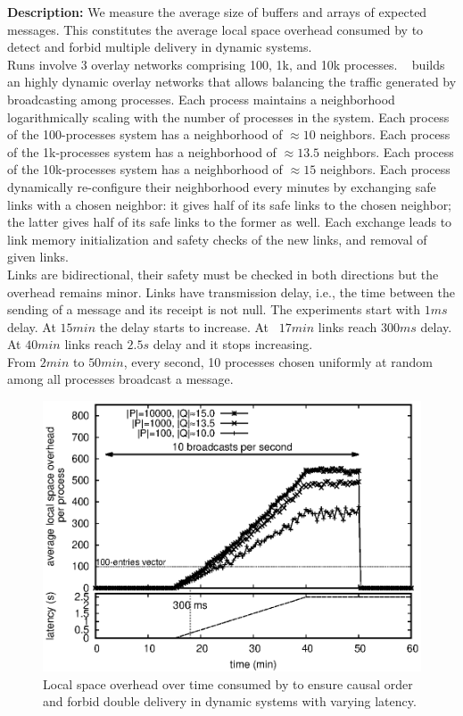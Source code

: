 \noindent \textbf{Description:} We measure the average size of buffers and
arrays of expected messages. This constitutes the average local space overhead
consumed by \RPCBROADCAST to detect and forbid multiple delivery in dynamic
systems.\\
Runs involve 3 overlay networks comprising 100, 1k, and 10k
processes. \SPRAY~\cite{nedelec2017adaptive} builds an highly dynamic overlay
networks that allows balancing the traffic generated by broadcasting among
processes. Each process maintains a neighborhood logarithmically scaling with
the number of processes in the system. Each process of the 100-processes system
has a neighborhood of $\approx 10$ neighbors. Each process of the 1k-processes
system has a neighborhood of $\approx 13.5$ neighbors. Each process of the
10k-processes system has a neighborhood of $\approx 15$ neighbors. Each process
dynamically re-configure their neighborhood every minutes by exchanging safe
links with a chosen neighbor: it gives half of its safe links to the chosen
neighbor; the latter gives half of its safe links to the former as well. Each
exchange leads to link memory initialization and safety checks of the new links,
and removal of given links.\\ Links are bidirectional, their safety must be
checked in both directions but the overhead remains minor. Links have
transmission delay, i.e., the time between the sending of a message and its
receipt is not null. The experiments start with $1ms$ delay. At $15min$ the
delay starts to increase. At ~$17min$ links reach $300ms$ delay. At $40min$
links reach $2.5s$ delay and it stops increasing.\\
From $2min$ to $50min$, every second, 10 processes chosen uniformly at random
among all processes broadcast a message.

\begin{figure}
  \begin{center}
    \includegraphics[width=0.8\columnwidth]{./img/overhead.eps}
    \caption{\label{fig:overhead}Local space overhead over time consumed by
      \RPCBROADCAST to ensure causal order and forbid double delivery in dynamic
      systems with varying latency.}
  \end{center}
\end{figure}

